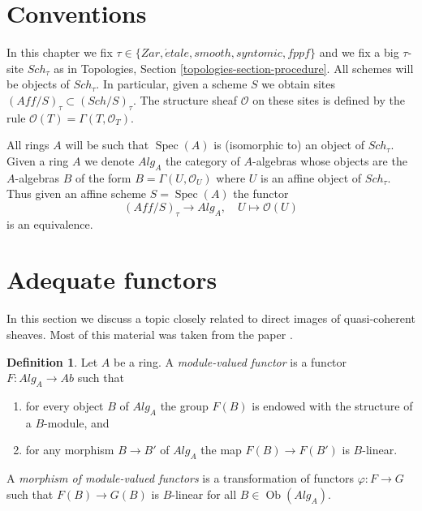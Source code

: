 \documentclass{stacks-project}
\theoremstyle{plain}
\theoremstyle{definition}
\newtheorem{definition}[subsection]{Definition}
\theoremstyle{remark}
\numberwithin{equation}{subsection}
\def\Spec{\mathop{\mathrm{Spec}}}
\def\Sch{\mathit{Sch}}
\def\Ob{\mathop{\mathrm{Ob}}\nolimits}
\def\etale{{\acute{e}tale}}
\begin{document}
\section{Conventions}
\label{section-conventions}

\noindent
In this chapter we fix
$\tau \in \{Zar, \etale, smooth, syntomic, fppf\}$
and we fix a big $\tau$-site $\Sch_\tau$ as in
Topologies, Section \ref{topologies-section-procedure}.
All schemes will be objects of $\Sch_\tau$.
In particular, given a scheme $S$ we obtain sites
$(\textit{Aff}/S)_\tau \subset (\Sch/S)_\tau$.
The structure sheaf $\mathcal{O}$ on these sites is defined by
the rule $\mathcal{O}(T) = \Gamma(T, \mathcal{O}_T)$.

\medskip\noindent
All rings $A$ will be such that $\Spec(A)$ is (isomorphic to) an
object of $\Sch_\tau$. Given a ring $A$ we denote
$\textit{Alg}_A$ the category of $A$-algebras whose objects are the
$A$-algebras $B$ of the form $B = \Gamma(U, \mathcal{O}_U)$
where $U$ is an affine object of $\Sch_\tau$. Thus given an
affine scheme $S = \Spec(A)$ the functor
$$
(\textit{Aff}/S)_\tau \longrightarrow \textit{Alg}_A,
\quad
U \longmapsto \mathcal{O}(U)
$$
is an equivalence.





\section{Adequate functors}
\label{section-quasi-coherent}

\noindent
In this section we discuss a topic closely related to
direct images of quasi-coherent sheaves. Most of this material
was taken from the paper \cite{Jaffe}.

\begin{definition}
\label{definition-module-valued-functor}
Let $A$ be a ring. A {\it module-valued functor} is a functor
$F : \textit{Alg}_A \to \textit{Ab}$ such that
\begin{enumerate}
\item for every object $B$ of $\textit{Alg}_A$ the group
$F(B)$ is endowed with the structure of a $B$-module, and
\item for any morphism $B \to B'$ of $\textit{Alg}_A$ the map
$F(B) \to F(B')$ is $B$-linear.
\end{enumerate}
A {\it morphism of module-valued functors} is a transformation of
functors $\varphi : F \to G$ such that $F(B) \to G(B)$ is $B$-linear
for all $B \in \Ob(\textit{Alg}_A)$.
\end{definition}
\end{document}
